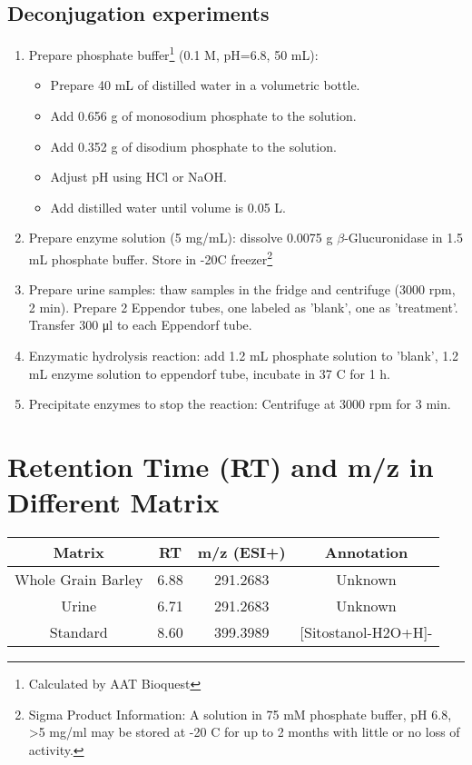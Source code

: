 \subsection{Deconjugation experiments}
\begin{enumerate}
\item Prepare phosphate buffer\footnote{Calculated by AAT Bioquest} (0.1 M, pH=6.8, 50 mL): 
	\begin{itemize}
		\item Prepare 40 mL of distilled water in a volumetric bottle.
		\item Add 0.656 g of monosodium phosphate to the solution.
		\item Add 0.352 g of disodium phosphate to the solution.
		\item Adjust pH using HCl or NaOH.
		\item Add distilled water until volume is 0.05 L.
	\end{itemize}

\item Prepare enzyme solution (5 mg/mL): dissolve 0.0075 g $\beta$-Glucuronidase in 1.5 mL phosphate buffer. Store in -20\degree C freezer\footnote{Sigma Product Information: A solution in 75 mM phosphate buffer, pH 6.8, \textgreater 5 mg/ml may be stored at -20 \degree C for up to 2 months with little or no loss of activity.}
\item Prepare urine samples: thaw samples in the fridge and centrifuge (3000 rpm, 2 min). Prepare 2 Eppendor tubes, one labeled as 'blank', one as 'treatment'. Transfer 300 \si{\micro\litre} to each Eppendorf tube.
\item Enzymatic hydrolysis reaction: add 1.2 \si{\milli\liter} phosphate solution to 'blank', 1.2 \si{\milli\liter} enzyme solution to eppendorf tube, incubate in 37 \degree C for 1 h.
\item Precipitate enzymes to stop the reaction: Centrifuge at 3000 rpm for 3 min.

\end{enumerate}


\section{Retention Time (RT) and m/z in Different Matrix}
\begin{tabular}{|c|c|c|c|}
	\hline 
	Matrix & RT & m/z (ESI+) & Annotation \\ 
	\hline 
	Whole Grain Barley & 6.88 & 291.2683 & Unknown \\ 
	\hline 
	Urine & 6.71 & 291.2683 & Unknown \\ 
	\hline 
	Standard & 8.60 & 399.3989 & [Sitostanol-H2O+H]- \\ 
	\hline 
\end{tabular} 
